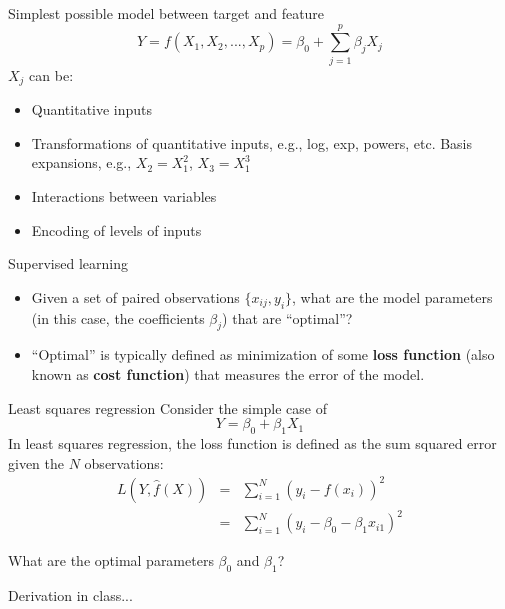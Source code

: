 \documentclass[aspectratio=169]{beamer}
\begin{document}
\begin{frame}{Simplest possible model between target and feature}
    \begin{equation*}
        Y=f(X_1,X_2,...,X_p)= \beta_0 + \sum_{j=1}^p \beta_j X_j
    \end{equation*}
    $X_j$ can be:
    \begin{itemize}
        \item Quantitative inputs
        \item Transformations of quantitative inputs, e.g., log, exp, powers, etc.
        Basis expansions, e.g., $X_2 = X_1^2$, $X_3 = X_1^3$
        \item Interactions between variables
        \item Encoding of levels of inputs
    \end{itemize}
\end{frame}


\begin{frame}{Supervised learning}
    \begin{itemize}
        \item Given a set of paired observations $\{x_{ij}, y_i\}$, what are the model parameters (in this case, the coefficients $\beta_j$) that are ``optimal''?
        \item ``Optimal'' is typically defined as minimization of some \textbf{loss function} (also known as \textbf{cost function}) that measures the error of the model.
    \end{itemize}
\end{frame}


\begin{frame}{Least squares regression}
    Consider the simple case of
    \begin{equation*}
        Y = \beta_0 + \beta_1 X_1
    \end{equation*}
    In least squares regression, the loss function is defined as the sum squared error given the $N$ observations:
    \begin{eqnarray*}
        L(Y, \hat{f}(X)) & = & \sum_{i=1}^N (y_i - f(x_i))^2 \\
        & = & \sum_{i=1}^N (y_i - \beta_0 - \beta_1 x_{i1})^2
    \end{eqnarray*}
    \end{frame}

    \begin{frame}{What are the optimal parameters $\beta_0$ and $\beta_1$?}
       \Huge{\centerline{Derivation in class...}}
    \end{frame}
\end{document}
